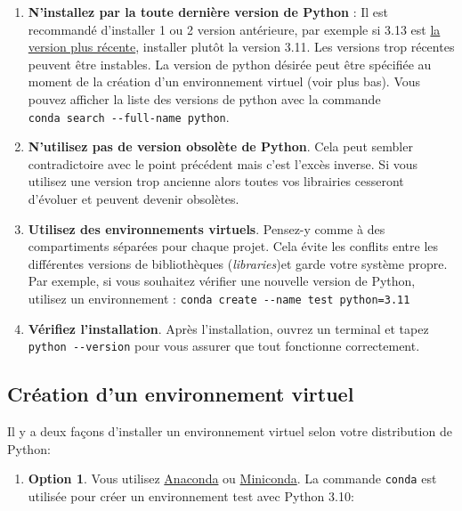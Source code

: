 \documentclass[
  11pt,
  letterpaper,
  open=any,
  twoside=false,
  french]{scrbook}
\providecommand{\tightlist}{%
  \setlength{\itemsep}{0pt}\setlength{\parskip}{0pt}}\usepackage{longtable,booktabs,array}
\begin{document}
\begin{enumerate}
\def\labelenumi{\arabic{enumi}.}
\item
  \textbf{N'installez par la toute dernière version de Python} : Il est
  recommandé d'installer 1 ou 2 version antérieure, par exemple si 3.13
  est \href{https://www.python.org/downloads/}{la version plus récente},
  installer plutôt la version 3.11. Les versions trop récentes peuvent
  être instables. La version de python désirée peut être spécifiée au
  moment de la création d'un environnement virtuel (voir plus bas). Vous
  pouvez afficher la liste des versions de python avec la commande
  \texttt{conda\ search\ -\/-full-name\ python}.
\item
  \textbf{N'utilisez pas de version obsolète de Python}. Cela peut
  sembler contradictoire avec le point précédent mais c'est l'excès
  inverse. Si vous utilisez une version trop ancienne alors toutes vos
  librairies cesseront d'évoluer et peuvent devenir obsolètes.
\item
  \textbf{Utilisez des environnements virtuels}. Pensez-y comme à des
  compartiments séparées pour chaque projet. Cela évite les conflits
  entre les différentes versions de bibliothèques (\emph{libraries})et
  garde votre système propre. Par exemple, si vous souhaitez vérifier
  une nouvelle version de Python, utilisez un environnement :
  \texttt{conda\ create\ -\/-name\ test\ python=3.11}
\item
  \textbf{Vérifiez l'installation}. Après l'installation, ouvrez un
  terminal et tapez \texttt{python\ -\/-version} pour vous assurer que
  tout fonctionne correctement.
\end{enumerate}

\subsection{Création d'un environnement virtuel}\label{sec-00-01}

Il y a deux façons d'installer un environnement virtuel selon votre
distribution de Python:

\begin{enumerate}
\def\labelenumi{\arabic{enumi}.}
\tightlist
\item
  \textbf{Option 1}. Vous utilisez
  \href{https://www.anaconda.com/download}{Anaconda} ou
  \href{https://docs.anaconda.com/miniconda/miniconda-install/}{Miniconda}.
  La commande \texttt{conda} est utilisée pour créer un environnement
  test avec Python 3.10:
\end{enumerate}
\end{document}
